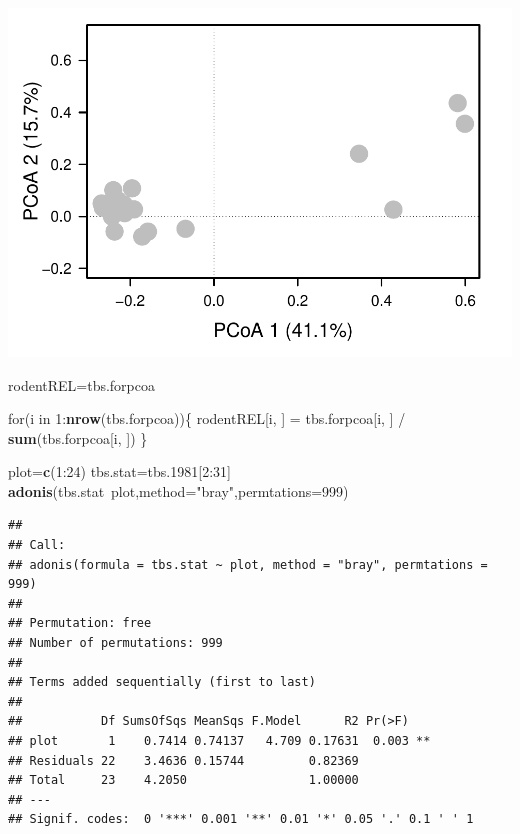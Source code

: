 \documentclass[]{article}
\newenvironment{Shaded}{\begin{snugshade}}{\end{snugshade}}
\newcommand{\KeywordTok}[1]{\textcolor[rgb]{0.13,0.29,0.53}{\textbf{{#1}}}}
\newcommand{\DataTypeTok}[1]{\textcolor[rgb]{0.13,0.29,0.53}{{#1}}}
\newcommand{\DecValTok}[1]{\textcolor[rgb]{0.00,0.00,0.81}{{#1}}}
\newcommand{\FloatTok}[1]{\textcolor[rgb]{0.00,0.00,0.81}{{#1}}}
\newcommand{\StringTok}[1]{\textcolor[rgb]{0.31,0.60,0.02}{{#1}}}
\newcommand{\NormalTok}[1]{{#1}}
\begin{document}
\includegraphics{temporal_assignment_files/figure-latex/unnamed-chunk-3-1.pdf}

\begin{Shaded}
\begin{Highlighting}[]
\NormalTok{rodentREL=tbs.forpcoa}

  \NormalTok{for(i in }\DecValTok{1}\NormalTok{:}\KeywordTok{nrow}\NormalTok{(tbs.forpcoa))\{}
    \NormalTok{rodentREL[i, ] =}\StringTok{ }\NormalTok{tbs.forpcoa[i, ] /}\StringTok{ }\KeywordTok{sum}\NormalTok{(tbs.forpcoa[i, ]) }
  \NormalTok{\}}

\NormalTok{plot=}\KeywordTok{c}\NormalTok{(}\DecValTok{1}\NormalTok{:}\DecValTok{24}\NormalTok{)}
\NormalTok{tbs.stat=tbs}\FloatTok{.1981}\NormalTok{[}\DecValTok{2}\NormalTok{:}\DecValTok{31}\NormalTok{]}
\KeywordTok{adonis}\NormalTok{(tbs.stat~plot,}\DataTypeTok{method=}\StringTok{"bray"}\NormalTok{,}\DataTypeTok{permtations=}\DecValTok{999}\NormalTok{)}
\end{Highlighting}
\end{Shaded}

\begin{verbatim}
## 
## Call:
## adonis(formula = tbs.stat ~ plot, method = "bray", permtations = 999) 
## 
## Permutation: free
## Number of permutations: 999
## 
## Terms added sequentially (first to last)
## 
##           Df SumsOfSqs MeanSqs F.Model      R2 Pr(>F)   
## plot       1    0.7414 0.74137   4.709 0.17631  0.003 **
## Residuals 22    3.4636 0.15744         0.82369          
## Total     23    4.2050                 1.00000          
## ---
## Signif. codes:  0 '***' 0.001 '**' 0.01 '*' 0.05 '.' 0.1 ' ' 1
\end{verbatim}
\end{document}

